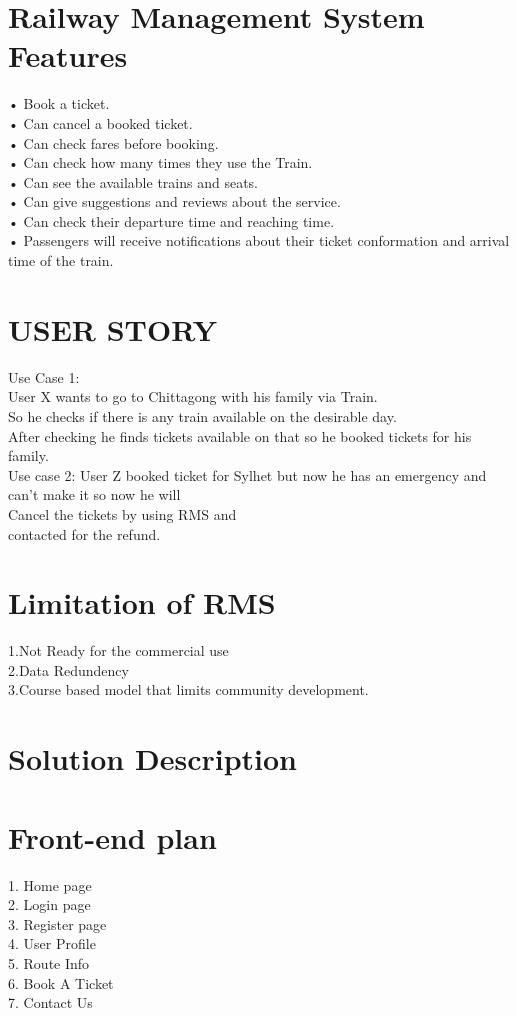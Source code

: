 \documentclass{article}
\begin{document}
 \section{Railway Management System Features}
•	Book a ticket.\\
•	Can cancel a booked ticket.\\
•	Can check fares before booking.\\
•	Can check how many times they use the Train.\\
•	Can see the available trains and seats.\\
•	Can give suggestions and reviews about the service.\\
•	Can check their departure time and reaching time.\\
•	Passengers will receive notifications about their ticket conformation and arrival time of the train.\\

\section{USER STORY}
Use Case 1:\\
User X wants to go to Chittagong with his family via Train.\\So he checks if there is any train available on the desirable day.\\After checking he finds tickets available on that so he booked tickets for his family.\\ 
Use case 2:
User Z booked ticket for Sylhet but now he has an emergency and can't make it so now he will\\ Cancel the tickets by using RMS and \\ contacted for the refund.
\section{Limitation of RMS}
1.Not Ready for the commercial use\\
2.Data Redundency\\
3.Course based model that limits community development.

\section{Solution Description}
\section{Front-end plan}
1. Home page\\
2. Login page\\
3. Register page\\
4. User Profile\\
5. Route Info\\
6. Book A Ticket\\
7. Contact Us\\
\end{document}

